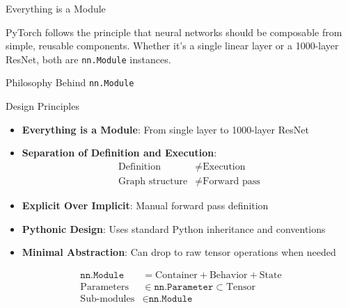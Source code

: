 \documentclass[aspectratio=169,xcolor=dvipsnames,svgnames,x11names,fleqn]{beamer}
\begin{document}
\begin{frame}{}

\begin{center}
\begin{block}{Everything is a Module}

PyTorch follows the principle that neural networks should be composable from simple, reusable components. Whether it's a single linear layer or a 1000-layer ResNet, both are \texttt{nn.Module} instances.

\end{block}
\end{center}

\end{frame}

\begin{frame}{Philosophy Behind \texttt{nn.Module}}

    \footnotesize

    \begin{block}{Design Principles}
\begin{itemize}
    \item \textbf{Everything is a Module}: From single layer to 1000-layer ResNet
    \item \textbf{Separation of Definition and Execution}:
    \begin{align*}
        \text{Definition} &\neq \text{Execution} \\
        \text{Graph structure} &\neq \text{Forward pass}
    \end{align*}
    \item \textbf{Explicit Over Implicit}: Manual forward pass definition
    \item \textbf{Pythonic Design}: Uses standard Python inheritance and conventions
    \item \textbf{Minimal Abstraction}: Can drop to raw tensor operations when needed
\end{itemize}

\vspace{5pt}

\begin{align*}
\texttt{nn.Module} &= \text{Container} + \text{Behavior} + \text{State} \\
\text{Parameters} &\in \texttt{nn.Parameter} \subset \text{Tensor} \\
\text{Sub-modules} &\in \texttt{nn.Module}
\end{align*}
\end{block}
\end{frame}
\end{document}

